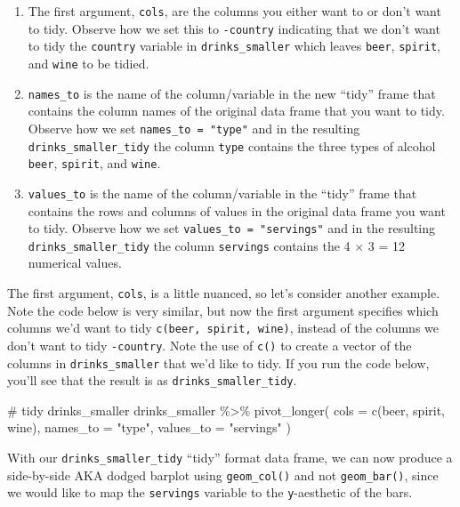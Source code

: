 \documentclass[
  letterpaper,
  DIV=11,
  numbers=noendperiod]{scrreprt}
\newenvironment{Shaded}{\begin{snugshade}}{\end{snugshade}}
\newcommand{\AttributeTok}[1]{\textcolor[rgb]{0.40,0.45,0.13}{#1}}
\newcommand{\CommentTok}[1]{\textcolor[rgb]{0.37,0.37,0.37}{#1}}
\newcommand{\FunctionTok}[1]{\textcolor[rgb]{0.28,0.35,0.67}{#1}}
\newcommand{\NormalTok}[1]{\textcolor[rgb]{0.00,0.23,0.31}{#1}}
\newcommand{\SpecialCharTok}[1]{\textcolor[rgb]{0.37,0.37,0.37}{#1}}
\newcommand{\StringTok}[1]{\textcolor[rgb]{0.13,0.47,0.30}{#1}}
\theoremstyle{definition}
\theoremstyle{remark}
\begin{document}
\begin{enumerate}
\def\labelenumi{\arabic{enumi}.}
\item
  The first argument, \texttt{cols}, are the columns you either want to
  or don't want to tidy. Observe how we set this to \texttt{-country}
  indicating that we don't want to tidy the \texttt{country} variable in
  \texttt{drinks\_smaller} which leaves \texttt{beer}, \texttt{spirit},
  and \texttt{wine} to be tidied.
\item
  \texttt{names\_to} is the name of the column/variable in the new
  ``tidy'' frame that contains the column names of the original data
  frame that you want to tidy. Observe how we set
  \texttt{names\_to\ =\ "type"} and in the resulting
  \texttt{drinks\_smaller\_tidy} the column \texttt{type} contains the
  three types of alcohol \texttt{beer}, \texttt{spirit}, and
  \texttt{wine}.
\item
  \texttt{values\_to} is the name of the column/variable in the ``tidy''
  frame that contains the rows and columns of values in the original
  data frame you want to tidy. Observe how we set
  \texttt{values\_to\ =\ "servings"} and in the resulting
  \texttt{drinks\_smaller\_tidy} the column \texttt{servings} contains
  the 4 \(\times\) 3 = 12 numerical values.
\end{enumerate}

The first argument, \texttt{cols}, is a little nuanced, so let's
consider another example. Note the code below is very similar, but now
the first argument specifies which columns we'd want to tidy
\texttt{c(beer,\ spirit,\ wine)}, instead of the columns we don't want
to tidy \texttt{-country}. Note the use of \texttt{c()} to create a
vector of the columns in \texttt{drinks\_smaller} that we'd like to
tidy. If you run the code below, you'll see that the result is as
\texttt{drinks\_smaller\_tidy}.

\begin{Shaded}
\begin{Highlighting}[]
\CommentTok{\# tidy drinks\_smaller}
\NormalTok{drinks\_smaller }\SpecialCharTok{\%\textgreater{}\%} 
  \FunctionTok{pivot\_longer}\NormalTok{(}
    \AttributeTok{cols =} \FunctionTok{c}\NormalTok{(beer, spirit, wine),}
    \AttributeTok{names\_to =} \StringTok{"type"}\NormalTok{, }
    \AttributeTok{values\_to =} \StringTok{"servings"}
\NormalTok{    )}
\end{Highlighting}
\end{Shaded}

With our \texttt{drinks\_smaller\_tidy} ``tidy'' format data frame, we
can now produce a side-by-side AKA dodged barplot using
\texttt{geom\_col()} and not \texttt{geom\_bar()}, since we would like
to map the \texttt{servings} variable to the \texttt{y}-aesthetic of the
bars.
\end{document}
